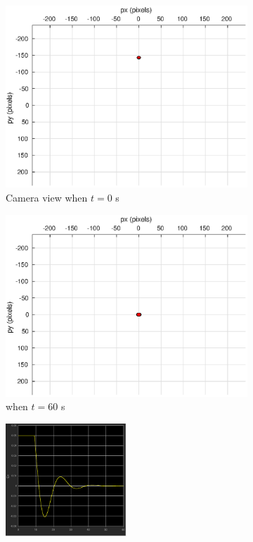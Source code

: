 \begin{figure}[htbp]
\begin{subfigure}[t]{0.45\linewidth}
		\includegraphics[width=\textwidth]{images/chapter4/inertial_camera_0mps}
		\caption{Camera view when $t=0$ s}
	\end{subfigure}
	\begin{subfigure}[t]{0.45\linewidth}
		\includegraphics[width=\textwidth]{images/chapter4/inertial_camera_0mps_60s}
		\caption{when $t=60$ s}
	\end{subfigure}
	\begin{subfigure}[t]{0.8\linewidth}
		\centering
		\includegraphics[width=0.5\textwidth]{images/chapter4/inertial_Ex_0mps}

\end{subfigure}
\end{figure}
